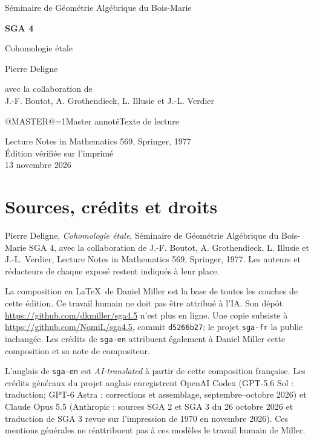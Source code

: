 \documentclass[oneside]{book}
\makeatletter
\theoremstyle{sga-source}
\theoremstyle{sga-source-dash}
\theoremstyle{sga-source-dotdash}
\theoremstyle{sga-source-number-note-dash}
\theoremstyle{sga-source-note-number-dotdash}
\theoremstyle{sga-source-example-dotdash}
\theoremstyle{sga-source-inline-number}
\theoremstyle{sga-source-bare-number}
\theoremstyle{sga-source}
\providecommand\EditionIsMaster{@MASTER@}
\makeatother
\begin{document}
\begin{titlepage}
\centering
\vspace*{2cm}
{\Large Séminaire de Géométrie Algébrique du Bois-Marie\par}
\vspace{0.7cm}
{\Huge\bfseries SGA 4\textonehalf\par}
\vspace{0.8cm}
{\huge Cohomologie étale\par}
\vspace{1cm}
{\Large Pierre Deligne\par}
\vspace{0.5cm}
avec la collaboration de\\[0.3em]
J.-F. Boutot, A. Grothendieck, L. Illusie et J.-L. Verdier
\vfill
{\Large \ifnum\EditionIsMaster=1\relax Master annoté\else Texte de lecture\fi\par}
\vspace{0.7cm}
Lecture Notes in Mathematics 569, Springer, 1977\\[0.4em]
Édition vérifiée sur l’imprimé\\
13 novembre 2026
\end{titlepage}

\chapter*{Sources, crédits et droits}
Pierre Deligne, \emph{Cohomologie étale}, Séminaire de Géométrie Algébrique
du Bois-Marie SGA 4\textonehalf, avec la collaboration de J.-F. Boutot,
A. Grothendieck, L. Illusie et J.-L. Verdier, Lecture Notes in Mathematics
569, Springer, 1977. Les auteurs et rédacteurs de chaque exposé restent
indiqués à leur place.

\medskip
La composition en \LaTeX\ de Daniel Miller est la base de toutes les couches
de cette édition. Ce travail humain ne doit pas être attribué à l’IA.
Son dépôt \url{https://github.com/dkmiller/sga4.5} n’est plus en ligne.
Une copie subsiste à \url{https://github.com/NomiL/sga4.5}, commit
\texttt{d5266b27}; le projet \texttt{sga-fr} la publie inchangée.
Les crédits de \texttt{sga-en} attribuent également à Daniel Miller cette
composition et sa note de compositeur.

\medskip
L’anglais de \texttt{sga-en} est \emph{AI-translated} à partir de cette
composition française. Les crédits généraux du projet anglais enregistrent
OpenAI Codex (GPT-5.6 Sol : traduction; GPT-6 Astra : corrections et
assemblage, septembre--octobre 2026) et Claude Opus 5.5 (Anthropic : sources
SGA 2 et SGA 3 du 26 octobre 2026 et traduction de SGA 3 revue sur
l’impression de 1970 en novembre 2026). Ces mentions générales ne
réattribuent pas à ces modèles le travail humain de Miller.
\end{document}
